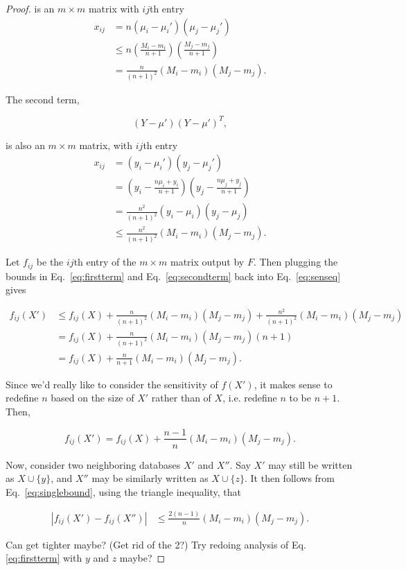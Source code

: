 \documentclass[11pt, oneside]{article}   	%
\begin{document}
\begin{proof}
is an $m \times m$ matrix with $ij$th entry
\begin{align}
x_{ij} &= n(\mu_i - \mu_i')(\mu_j - \mu_j') \nonumber \\
	&\le n\left(\frac{M_i - m_i}{n+1}\right)\left(\frac{M_j - m_j}{n+1}\right) \nonumber \\
	&= \frac{n}{(n+1)^2} (M_i-m_i)(M_j-m_j).
\label{eq:firstterm}
\end{align}

The second term, 

$$ (Y-\mu')(Y-\mu')^T, $$

is also an $m \times m$ matrix, with $ij$th entry
\begin{align}
x_{ij} &= (y_i - \mu_i') (y_j - \mu_j') \nonumber\\
	&= \left( y_i - \frac{n\mu_i + y_i}{n+1} \right)\left( y_j - \frac{n\mu_j + y_j}{n+1} \right) \nonumber\\
	&= \frac{n^2}{(n+1)^2}(y_i - \mu_i)(y_j - \mu_j) \nonumber\\
	&\le \frac{n^2}{(n+1)^2}(M_i - m_i)(M_j - m_j).
\label{eq:secondterm}
\end{align}

Let $f_{ij}$ be the $ij$th entry of the $m\times m$ matrix output by $F$. Then plugging the bounds in Eq.~\ref{eq:firstterm} and Eq.~\ref{eq:secondterm} back into Eq.~\ref{eq:senseq} gives

\begin{align}
f_{ij}(X') &\le f_{ij}(X) + \frac{n}{(n+1)^2} (M_i-m_i)(M_j-m_j) + \frac{n^2}{(n+1)^2}(M_i - m_i)(M_j - m_j) \nonumber \\
&= f_{ij}(X) +\frac{n}{(n+1)^2}(M_i - m_i)(M_j - m_j)(n+1) \nonumber\\
&= f_{ij}(X) + \frac{n}{n+1}(M_i - m_i)(M_j - m_j).
\end{align}

Since we'd really like to consider the sensitivity of $f(X')$, it makes sense to redefine $n$ based on the size of $X'$ rather than of $X$, i.e. redefine $n$ to be $n+1$. Then,

\begin{equation}
f_{ij}(X') = f_{ij}(X) + \frac{n-1}{n}(M_i - m_i)(M_j - m_j).
\label{eq:singlebound}
\end{equation}

Now, consider two neighboring databases $X'$ and $X''$. Say $X'$ may still be written as $X \cup \{y\}$, and $X''$ may be similarly written as $X \cup \{z\}.$ It then follows from Eq.~\ref{eq:singlebound}, using the triangle inequality, that

\begin{align*}
\left\vert f_{ij}(X')-f_{ij}(X'') \right\vert &\le \frac{2(n-1)}{n}(M_i - m_i)(M_j - m_j).
\end{align*}

Can get tighter maybe? (Get rid of the 2?) Try redoing analysis of Eq. \ref{eq:firstterm} with $y$ and $z$ maybe?

\end{proof}
\end{document}
